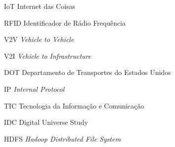 \begin{siglas}
  \item[IoT] Internet das Coisas
  \item[RFID] Identificador de Rádio Frequência
  \item[V2V] \textit{Vehicle to Vehicle}
  \item[V2I] \textit{Vehicle to Infrastructure}
  \item[DOT] Departamento de Transportes do Estados Unidos
  \item[IP]  \textit{Internal Protocol}
  \item[TIC] Tecnologia da Informação e Comunicação
  \item[IDC] Digital Universe Study
  \item[HDFS] \textit{Hadoop Distributed File System}
\end{siglas}